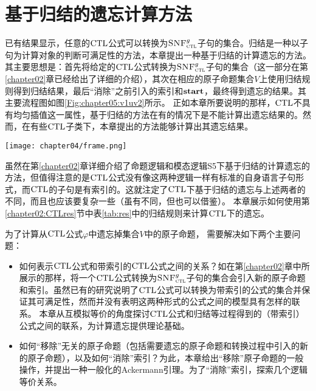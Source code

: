 \section{基于归结的遗忘计算方法}
\label{chapter05:sec:resolution}
	已有结果显示，任意的$\textrm{CTL}$公式可以转换为${\textsc{SNF}_{\textsc{ctl}}^g}$子句的集合。归结是一种以子句为计算对象的判断可满足性的方法，本章提出一种基于归结的计算遗忘的方法。
	其主要思想是：首先将给定的$\textrm{CTL}$公式转换为${\textsc{SNF}_{\textsc{ctl}}^g}$子句的集合（这一部分在第\ref{chapter02}章已经给出了详细的介绍），其次在相应的原子命题集合$V$上使用归结规则得到归结结果，最后“消除”之前引入的索引和$\textbf{start}$，最终得到遗忘的结果。其主要流程图如图\ref{Fig:chapter05:v1uv2}所示。
	正如本章所要说明的那样，$\textrm{CTL}$不具有均匀插值这一属性，基于归结的方法在有的情况下是不能计算出遗忘结果的。然而，在有些$\textrm{CTL}$子类下，本章提出的方法能够计算出其遗忘结果。
\begin{figure*}[!htb]
	\centering
	\texttt{[image: chapter04/frame.png]}\\
	\caption{基于归结的遗忘的主要流程图}
	\label{Fig:chapter05:v1uv2}
\end{figure*}

虽然在第\ref{chapter02}章详细介绍了命题逻辑和模态逻辑S5下基于归结的计算遗忘的方法，但值得注意的是$\textrm{CTL}$公式没有像这两种逻辑一样有标准的自身语言子句形式，而$\textrm{CTL}$的子句是有索引的。这就注定了$\textrm{CTL}$下基于归结的遗忘与上述两者的不同，而且也应该要复杂一些（虽有不同，但也可以借鉴）。
本章展示如何使用第\ref{chapter02:CTLres}节中表\ref{tab:res}中的归结规则来计算$\textrm{CTL}$下的遗忘。


为了计算从$\textrm{CTL}$公式$\varphi$中遗忘掉集合$V$中的原子命题，
需要解决如下两个主要问题：
\begin{itemize}
	\item[(1)] 如何表示$\textrm{CTL}$公式和带索引的$\textrm{CTL}$公式之间的关系？如在第\ref{chapter02}章中所展示的那样，将一个$\textrm{CTL}$公式转换为${\textsc{SNF}_{\textsc{ctl}}^g}$子句的集合会引入新的原子命题和索引。虽然已有的研究说明了$\textrm{CTL}$公式可以转换为带索引的公式的集合并保证其可满足性，然而并没有表明这两种形式的公式之间的模型具有怎样的联系。
	本章从互模拟等价的角度探讨$\textrm{CTL}$公式和归结等过程得到的（带索引）公式之间的联系，为计算遗忘提供理论基础。
	\item[(2)] 如何“移除”无关的原子命题（包括需要遗忘的原子命题和转换过程中引入的新的原子命题），以及如何“消除”索引？为此，本章给出“移除”原子命题的一般操作，并提出一种一般化的Ackermann引理。为了“消除”索引，探索几个逻辑等价关系。%
\end{itemize}

